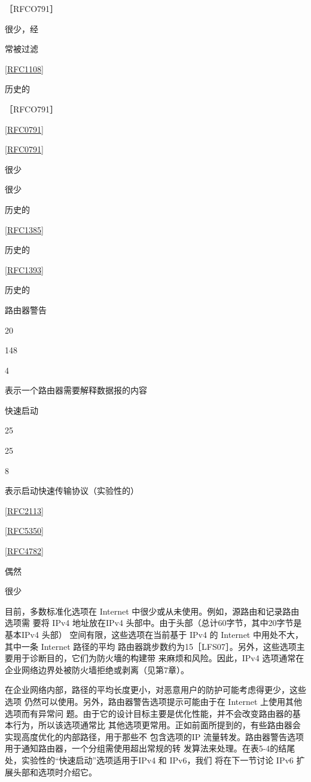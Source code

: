 ［RFCO791］

很少，经

常被过滤

\href{https://www.rfc-editor.org/rfc/rfc1108}{[RFC1108]}

历史的

［RFCO791］

\href{https://www.rfc-editor.org/rfc/rfc0791}{[RFC0791]}

\href{https://www.rfc-editor.org/rfc/rfc0791}{[RFC0791]}

很少

很少

历史的

\href{https://www.rfc-editor.org/rfc/rfc1385}{[RFC1385]}

历史的

\href{https://www.rfc-editor.org/rfc/rfc1393}{[RFC1393]}

历史的

路由器警告

20

148

4

表示一个路由器需要解释数据报的内容

快速启动

25

25

8

表示启动快速传输协议（实验性的）

\href{https://www.rfc-editor.org/rfc/rfc2113}{[RFC2113]}

\href{https://www.rfc-editor.org/rfc/rfc5350}{[RFC5350]}

\href{https://www.rfc-editor.org/rfc/rfc4782}{[RFC4782]}

偶然

很少

目前，多数标准化选项在 Internet 中很少或从未使用。例如，源路由和记录路由选项需
要将 IPv4 地址放在IPv4 头部中。由于头部（总计60字节，其中20字节是基本IPv4 头部）
空间有限，这些选项在当前基于 IPv4 的 Internet 中用处不大，其中一条 Internet 路径的平均
路由器跳步数约为15［LFS07］。另外，这些选项主要用于诊断目的，它们为防火墻的构建带
来麻烦和风险。因此，IPv4 选项通常在企业网络边界处被防火墙拒绝或剥离（见第7章）。

在企业网络内部，路径的平均长度更小，对恶意用户的防护可能考虑得更少，这些选项
仍然可以使用。另外，路由器警告选项提示可能由于在 Internet 上使用其他选项而有异常问
题。由于它的设计目标主要是优化性能，并不会改变路由器的基本行为，所以该选项通常比
其他选项更常用。正如前面所提到的，有些路由器会实现高度优化的内部路径，用于那些不
包含选项的IP 流量转发。路由器警告选项用于通知路由器，一个分组需使用超出常规的转
发算法来处理。在表5-4的结尾处，实验性的“快速启动”选项适用于IPv4 和 IPv6，我们
将在下一节讨论 IPv6 扩展头部和选项时介绍它。

